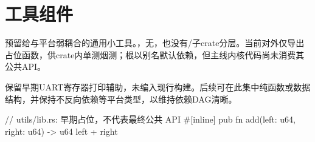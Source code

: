 
\section{工具组件}

预留给与平台弱耦合的通用小工具。\code{\#![no\_std]}，无\code{[dependencies]}，也没有/子crate分层。当前对外仅导出占位函数，供crate内单测烟测；根以别名默认依赖，但主线内核代码尚未消费其公共API。

保留早期UART寄存器打印辅助，未编入现行构建。后续可在此集中纯函数或数据结构，并保持不反向依赖等平台类型，以维持依赖DAG清晰。

\begin{rustcode}
// utils/lib.rs: 早期占位，不代表最终公共 API
#[inline]
pub fn add(left: u64, right: u64) -> u64 { left + right }
\end{rustcode}
